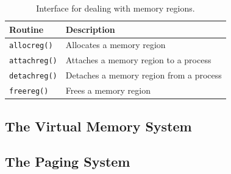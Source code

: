 \documentclass[10pt,a4paper]{article}
\begin{document}
\begin{table}[!t]
\small
\centering
\caption{Interface for dealing with memory regions.}
\label{table: memory region interface}
\begin{tabular}{l l}
	\toprule
	Routine & Description                                          \\
	\midrule
	\texttt{allocreg()}  & Allocates a memory region               \\
	\texttt{attachreg()} & Attaches a memory region to a process   \\
	\texttt{detachreg()} & Detaches a memory region from a process \\
	\texttt{freereg()}   & Frees a memory region                   \\
	\bottomrule
\end{tabular}
\end{table}

\subsection{The Virtual Memory System}

\subsection{The Paging System}

\end{document}
